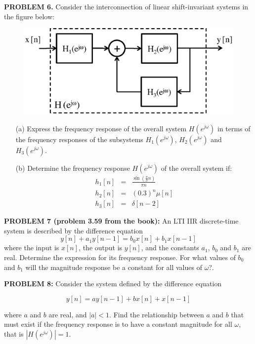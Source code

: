 \documentclass[a4paper,11pt,oneside]{article}
\begin{document}
\textbf{PROBLEM 6.} Consider the interconnection of linear shift-invariant systems in the figure below:



\begin{figure}[h!]
\centering
\includegraphics[width=.7\textwidth]{fig5.eps}
\end{figure}



\begin{itemize}
\item[(a)] Express the frequency response of the overall system $H(e^{j\omega})$ in terms of the frequency responses of the subsystems $H_1(e^{j\omega})$, $H_2(e^{j\omega})$ and $H_3(e^{j\omega})$.
\item[(b)] Determine the frequency response $H(e^{j\omega})$ of the overall system if:
\[
\begin{array}{lll}
h_1[n] &=& \frac{\sin(\frac{\pi}{3}n)}{\pi n}\\
h_2[n] &=&(0.3)^{n}\mu[n]\\
h_3[n] &=&\delta[n-2]
\end{array}
\]
\end{itemize}


\vspace{1cm}
 


\textbf{PROBLEM 7 (problem 3.59 from the book):} An LTI IIR discrete-time system is described by the difference equation
\[
y[n] + a_1y[n-1] = b_0x[n]+b_1x[n-1]
\]
where the input is $x[n]$, the output is $y[n]$, and the constants $a_1$, $b_0$ and $b_1$ are real. Determine the expression for its frequency response. For what values of $b_0$ and $b_1$ will the magnitude response be a constant for all values of $\omega$?.




\vspace{1cm}




\textbf{PROBLEM 8:} Consider the system defined by the difference equation 

\[
y[n] = ay[n-1]+bx[n]+x[n-1]
\]

where $a$ and $b$ are real, and $|a|<1$. Find the relationship between $a$ and $b$ that must exist if the frequency response is to have a constant magnitude for all $\omega$, that is $|H(e^{j\omega})|=1$.
\vspace{1cm}
\end{document}
